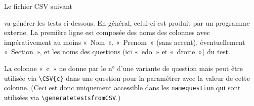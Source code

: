 \documentclass[12pt,a4paper, rulers]{tests}
\begin{document}
\newpage
Le fichier CSV suivant

va générer les tests ci-dessous.  En général, celui-ci est produit
par un programme externe.  La première ligne est composée des noms des
colonnes avec impérativement au moins «~Nom~», «~Prenom~» (sans
accent), éventuellement «~Section~», et les noms des questions (ici
«~edo~» et «~droite~») du test.

La colonne «~c~» ne donne par le n° d'une variante de question mais
peut être utilisée via \verb+\CSV{c}+ dans une question pour la
paramétrer avec la valeur de cette colonne.  (Ceci est donc uniquement
accessible dans les \verb+namequestion+ qui sont utilisées via
\verb+\generatetestsfromCSV+.)

\end{document}
